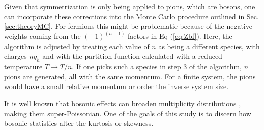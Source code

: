 Given that symmetrization is only being applied to pions, which are bosons, one can incorporate these corrections into the Monte Carlo procedure outlined in Sec. \ref{sec:theoryMC}. For fermions this might be problematic because of the negative weights coming from the $(-1)^(n-1)$ factors in Eq (\ref{eq:Zbf}). Here, the algorithm is adjusted by treating each value of $n$ as being a different species, with charges $nq_h$ and with the partition function calculated with a reduced temperature $T\rightarrow T/n$. If one picks such a species in step 3 of the algorithm, $n$ pions are generated, all with the same momentum. For a finite system, the pions would have a small relative momentum or order the inverse system size.

It is well known that bosonic effects can broaden multiplicity distributions \cite{negativebinomial}, making them super-Poissonian. One of the goals of this study is to discern how bosonic statistics alter the kurtosis or skewness. 

